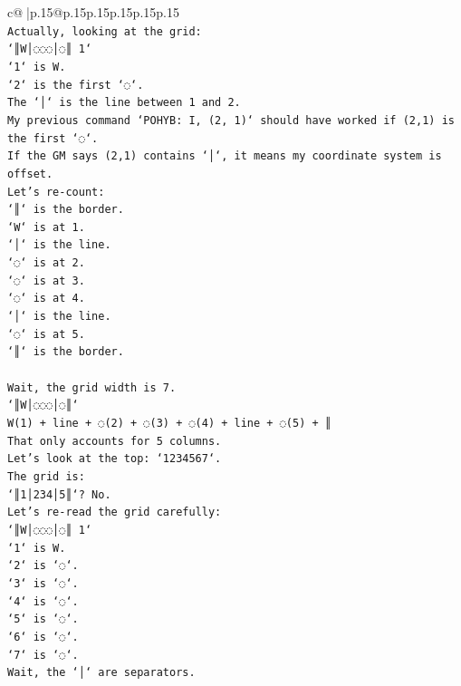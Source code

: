 \documentclass{article}
\begin{document}
{\begin{supertabular}{c@{$\;$}|p{.15\linewidth}@{}p{.15\linewidth}p{.15\linewidth}p{.15\linewidth}p{.15\linewidth}p{.15\linewidth}}
{{{\\ 
\texttt{Actually, looking at the grid:} \\
\texttt{`║W│◌◌◌│◌║ 1`} \\
\texttt{`1` is W.} \\
\texttt{`2` is the first `◌`.} \\
\texttt{The `│` is the line between 1 and 2.} \\
\texttt{My previous command `POHYB: I, (2, 1)` should have worked if (2,1) is the first `◌`.} \\
\texttt{If the GM says (2,1) contains `│`, it means my coordinate system is offset.} \\
\texttt{Let's re{-}count:} \\
\texttt{`║` is the border.} \\
\texttt{`W` is at 1.} \\
\texttt{`│` is the line.} \\
\texttt{`◌` is at 2.} \\
\texttt{`◌` is at 3.} \\
\texttt{`◌` is at 4.} \\
\texttt{`│` is the line.} \\
\texttt{`◌` is at 5.} \\
\texttt{`║` is the border.} \\
\\ 
\texttt{Wait, the grid width is 7.} \\
\texttt{`║W│◌◌◌│◌║`} \\
\texttt{W(1) + line + ◌(2) + ◌(3) + ◌(4) + line + ◌(5) + ║} \\
\texttt{That only accounts for 5 columns.} \\
\texttt{Let's look at the top: `1234567`.} \\
\texttt{The grid is:} \\
\texttt{`║1│234│5║`? No.} \\
\texttt{Let's re{-}read the grid carefully:} \\
\texttt{`║W│◌◌◌│◌║ 1`} \\
\texttt{`1` is W.} \\
\texttt{`2` is `◌`.} \\
\texttt{`3` is `◌`.} \\
\texttt{`4` is `◌`.} \\
\texttt{`5` is `◌`.} \\
\texttt{`6` is `◌`.} \\
\texttt{`7` is `◌`.} \\
\texttt{Wait, the `│` are separators.} \\
}}}
\end{supertabular}}
\end{document}
